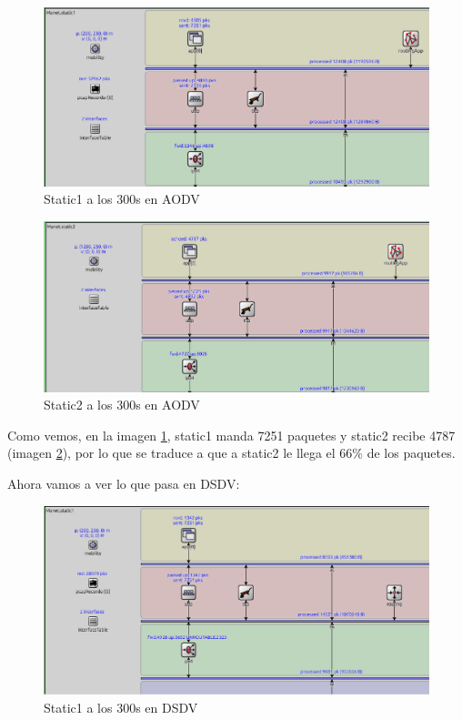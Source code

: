 \begin{figure}[H]
    \centering
    \includegraphics[width=155mm, scale=0.75]{imaxes/aodv_dsdv/ejercicio3_4_static1_aodv.png}
    \caption{Static1 a los 300s en AODV}
    \label{fig:ejer3_4_1}
\end{figure}

\begin{figure}[H]
    \centering
    \includegraphics[width=155mm, scale=0.75]{imaxes/aodv_dsdv/ejercicio3_4_static2_aodv.png}
    \caption{Static2 a los 300s en AODV}
    \label{fig:ejer3_4_2}
\end{figure}

Como vemos, en la imagen \ref{fig:ejer3_4_1}, static1 manda 7251 paquetes y static2 recibe 4787 (imagen \ref{fig:ejer3_4_2}), por lo que se traduce a que a static2 le llega el 66\% de los paquetes.

Ahora vamos a ver lo que pasa en DSDV:

\begin{figure}[H]
    \centering
    \includegraphics[width=155mm, scale=0.75]{imaxes/aodv_dsdv/ejercicio3_4_static1_dsdv.png}
    \caption{Static1 a los 300s en DSDV}
    \label{fig:ejer3_4_3}
\end{figure}

